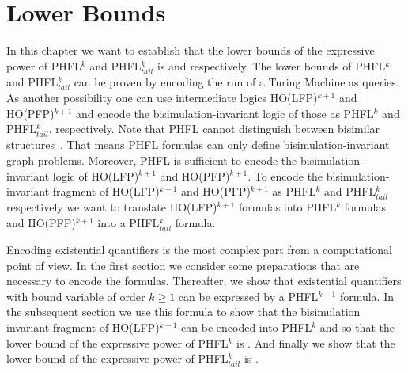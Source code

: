 
\chapter{Lower Bounds}\label{ch:lowerBounds}

In this chapter we want to establish that the lower bounds of the expressive power of PHFL$^k$ and PHFL$^k_{tail}$ is  and  respectively. The
lower bounds of PHFL$^k$ and PHFL$^k_{tail}$ can be proven by encoding the run of a Turing Machine as queries.
As another possibility one can use intermediate logics HO(LFP)$^{k+1}$ and HO(PFP)$^{k+1}$ and encode the bisimulation-invariant logic of those as PHFL$^k$ and
PHFL$^k_{tail}$, respectively. Note that PHFL cannot distinguish between bisimilar structures~\cite{viswanathan2004higher}. That means PHFL formulas can only define bisimulation-invariant
graph problems. Moreover, PHFL is sufficient to encode the bisimulation-invariant logic of HO(LFP)$^{k+1}$ and HO(PFP)$^{k+1}$. To encode the bisimulation-invariant fragment of HO(LF\-P)$^{k+1}$ and HO(PFP)$^{k+1}$ as PHFL$^k$ and
PHFL$^{k}_{tail}$ respectively we want to translate HO(LFP)$^{k+1}$ formulas into PHFL$^k$ formulas and 
HO(PFP)$^{k+1}$ into a PHFL$^k_{tail}$ formula. 

Encoding existential quantifiers is the most complex part from a computational point of view. In the 
first section we consider some preparations that are necessary to encode the formulas. Thereafter,  we show that existential 
quantifiers with bound variable of order $k \geq 1$ can be expressed by a PHFL$^{k-1}$ formula. In the subsequent section we 
use this formula to show that the bisimulation invariant fragment of HO(LFP)$^{k+1}$ can be encoded into PHFL$^k$ and so 
that the lower bound of the expressive power of PHFL$^k$ is . And finally we show that the lower bound 
of the expressive power of PHFL$^k_{tail}$ is .








